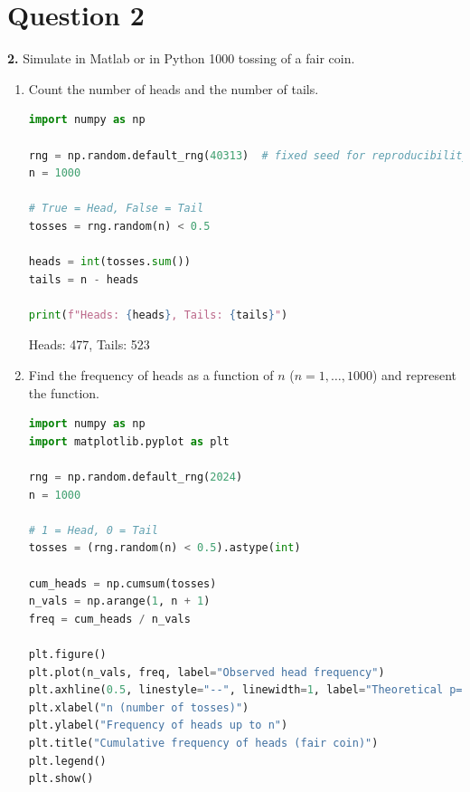 \documentclass[dvipsnames,11pt]{article}
\begin{document}

\section*{Question 2}

\textbf{2.} Simulate in Matlab or in Python 1000 tossing of a fair coin.

    \begin{enumerate}
        \item Count the number of heads and the number of tails.

            \begin{solution}

\begin{lstlisting}[language=python]
import numpy as np

rng = np.random.default_rng(40313)  # fixed seed for reproducibility
n = 1000

# True = Head, False = Tail
tosses = rng.random(n) < 0.5

heads = int(tosses.sum())
tails = n - heads

print(f"Heads: {heads}, Tails: {tails}")
\end{lstlisting}

                Heads: 477, Tails: 523
            
            \end{solution}
        
        \item Find the frequency of heads as a function of $n$ ($n=1,\dots,1000$) and represent the function.

            \begin{solution}
    
\begin{lstlisting}[language=python]
import numpy as np
import matplotlib.pyplot as plt

rng = np.random.default_rng(2024)
n = 1000

# 1 = Head, 0 = Tail
tosses = (rng.random(n) < 0.5).astype(int)

cum_heads = np.cumsum(tosses)
n_vals = np.arange(1, n + 1)
freq = cum_heads / n_vals

plt.figure()
plt.plot(n_vals, freq, label="Observed head frequency")
plt.axhline(0.5, linestyle="--", linewidth=1, label="Theoretical p=0.5")
plt.xlabel("n (number of tosses)")
plt.ylabel("Frequency of heads up to n")
plt.title("Cumulative frequency of heads (fair coin)")
plt.legend()
plt.show()
\end{lstlisting}


\end{solution}
\end{enumerate}
\end{document}
